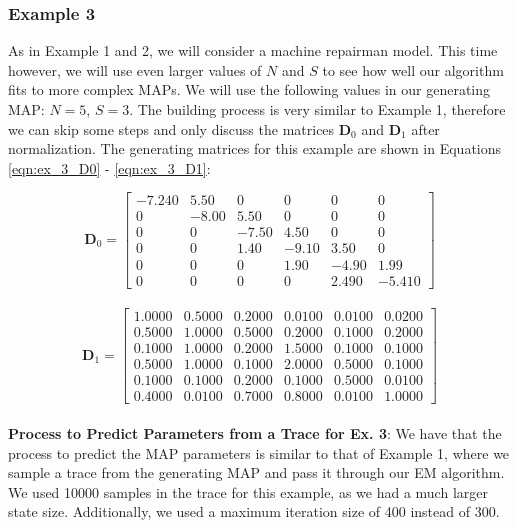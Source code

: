 \documentclass[a4paper,11pt,titlepage]{article}
\begin{document}
\subsubsection{Example 3}

As in Example 1 and 2, we will consider a machine repairman model. This time however, we will use even larger values of $N$ and $S$ to see how well our algorithm fits to more complex MAPs. We will use the following values in our generating MAP: $N=5$, $S=3$. The building process is very similar to Example 1, therefore we can skip some steps and only discuss the matrices $\mathbf{D}_0$ and $\mathbf{D}_1$ after normalization. The generating matrices for this example are shown in Equations \ref{eqn:ex_3_D0} - \ref{eqn:ex_3_D1}: 

\begin{equation}
    \mathbf{D}_{0} = 
\begin{bmatrix}
-7.240 & 5.50 & 0 & 0 & 0 & 0\\
0 & -8.00 & 5.50 & 0 & 0 & 0\\
0 & 0 & -7.50 & 4.50 & 0 & 0\\
0 & 0 & 1.40 & -9.10 & 3.50 & 0\\
0 & 0 & 0 & 1.90 & -4.90 & 1.99\\
0 & 0 & 0 & 0 & 2.490 & -5.410
\end{bmatrix}
\label{eqn:ex_3_D0}
\end{equation} \\


\begin{equation}
    \mathbf{D}_{1} = 
\begin{bmatrix}
1.0000  &  0.5000  &  0.2000  &  0.0100  &  0.0100 & 0.0200\\
0.5000  &  1.0000 &   0.5000  &  0.2000  &  0.1000 & 0.2000\\
0.1000  &  1.0000  &  0.2000  &  1.5000  &  0.1000 & 0.1000\\
0.5000 &   1.0000  &  0.1000 &   2.0000 &   0.5000 & 0.1000\\
0.1000  &  0.1000  &  0.2000  &  0.1000  &  0.5000 & 0.0100\\
0.4000 &   0.0100   & 0.7000  &  0.8000 &   0.0100& 1.0000
\end{bmatrix}
\label{eqn:ex_3_D1}
\end{equation}  \\

\textbf{Process to Predict Parameters from a Trace for Ex. 3}: We have that the process to predict the MAP parameters is similar to that of Example 1, where we sample a trace from the generating MAP and pass it through our EM algorithm. We used 10000 samples in the trace for this example, as we had a much larger state size. Additionally, we used a maximum iteration size of 400 instead of 300. \\
\end{document}
